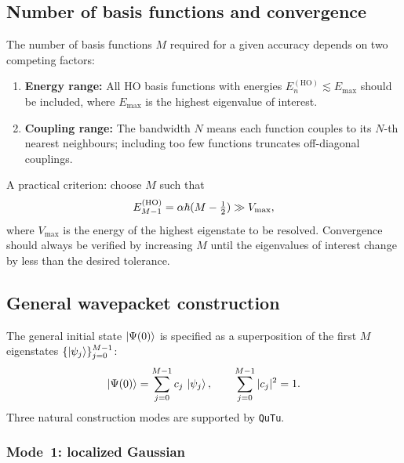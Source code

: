 \subsection{Number of basis functions and convergence}\label{sec:conv_gen}

The number of basis functions $M$ required for a given accuracy depends on
two competing factors:
\begin{enumerate}
  \item \textbf{Energy range:} All HO basis functions with energies
        $E_n^{(\mathrm{HO})}\lesssim E_{\mathrm{max}}$ should be included,
        where $E_{\mathrm{max}}$ is the highest eigenvalue of interest.
  \item \textbf{Coupling range:} The bandwidth $N$ means each function couples
        to its $N$-th nearest neighbours; including too few functions truncates
        off-diagonal couplings.
\end{enumerate}

A practical criterion: choose $M$ such that
\begin{equation}\label{eq:M_criterion}
  E_{M-1}^{(\mathrm{HO})} = \alpha\hbar(M-\tfrac{1}{2}) \gg V_{\mathrm{max}},
\end{equation}
where $V_{\mathrm{max}}$ is the energy of the highest eigenstate to be
resolved.  Convergence should always be verified by increasing $M$ until the
eigenvalues of interest change by less than the desired tolerance.

\subsection{General wavepacket construction}\label{sec:gen_wp}

The general initial state $\ket{\Psi(0)}$ is specified as a superposition of
the first $M$ eigenstates $\{\ket{\psi_j}\}_{j=0}^{M-1}$:
\begin{equation}\label{eq:gen_wp}
  \ket{\Psi(0)} = \sum_{j=0}^{M-1} c_j\,\ket{\psi_j},
  \qquad
  \sum_{j=0}^{M-1}|c_j|^2 = 1.
\end{equation}
Three natural construction modes are supported by \texttt{QuTu}.

\subsubsection{Mode~1: localized Gaussian}\label{sec:wp_gaussian}

